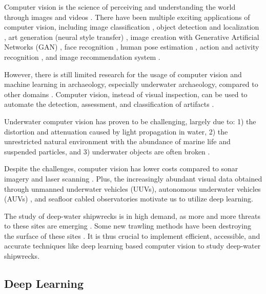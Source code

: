 \documentclass[a4paper, 11pt, oneside]{article}
\begin{document}
\label{sec:cvForUnderwater}

Computer vision is the science of perceiving and understanding the world through images and videos \cite{elgendy2020deep}.
There have been multiple exciting applications of computer vision, including image classification \cite{rawat2017deep},
object detection and localization \cite{zhao2019object,liu2020deep}, art generation (neural style transfer)
\cite{jing2019neural}, image creation with Generative Artificial Networks (GAN) \cite{goodfellow2014generative},
face recognition \cite{parkhi2015deep}, human pose estimation \cite{toshev2014deeppose}, action and activity recognition
\cite{poppe2010survey}, and image recommendation system \cite{niu2018neural}.

However, there is still limited research for the usage of computer vision and machine learning in archaeology,
especially underwater archaeology, compared to other domains \cite{maaten2007computer, qin2015underwater}.
Computer vision, instead of visual inspection, can be used to automate the detection, assessment, and classification
of artifacts \cite{maaten2007computer}.

Underwater computer vision has proven to be challenging, largely due to: 1) the distortion and attenuation caused by
light propagation in water, 2) the unrestricted natural environment with the abundance of marine life and suspended
particles, and 3) underwater objects are often broken
\cite{qin2015underwater, rizzini2015investigation, lu2017underwater, mccarthy20193d}.

Despite the challenges, computer vision has lower costs \cite{rizzini2015investigation} compared to sonar imagery
\cite{abu2019statistically} and laser scanning \cite{gordon1992use}. Plus, the increasingly abundant visual data obtained
through unmanned underwater vehicles (UUVs), autonomous underwater vehicles (AUVs)
\cite{lu2017underwater, moniruzzaman2017deep}, and seafloor cabled observatories \cite{qin2015underwater} motivate us
to utilize deep learning.

The study of deep-water shipwrecks is in high demand, as more and more threats to these sites are emerging
\cite{drap2015underwater}. Some new trawling methods have been destroying the surface of these sites \cite{drap2015underwater}.
It is thus crucial to implement efficient, accessible, and accurate techniques like deep learning based computer vision to
study deep-water shipwrecks.

\subsection{Deep Learning}
\end{document}
